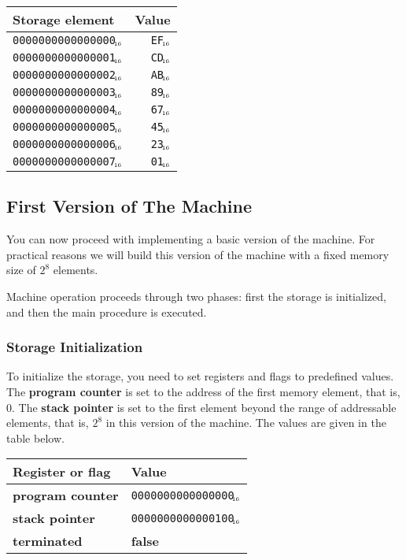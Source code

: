 \documentclass[a4paper,11pt]{article}
\newcommand{\PC}{\textbf{program counter}\xspace}
\newcommand{\SP}{\textbf{stack pointer}\xspace}
\newcommand{\TERM}{\textbf{terminated}\xspace}
\newcommand{\F}{\textbf{false}\xspace}
\newcommand{\num}[1]{\texttt{#1}\xspace}
\newcommand{\hex}[1]{\num{#1}$_{\textup{\tiny\hskip-1ex 16}}$\xspace}
\begin{document}
\begin{center}
  \begin{tabular}{@{}lr@{}}
    \hline
    Storage element        & Value    \\
    \hline
    \hex{0000000000000000} & \hex{EF} \\
    \hex{0000000000000001} & \hex{CD} \\
    \hex{0000000000000002} & \hex{AB} \\
    \hex{0000000000000003} & \hex{89} \\
    \hex{0000000000000004} & \hex{67} \\
    \hex{0000000000000005} & \hex{45} \\
    \hex{0000000000000006} & \hex{23} \\
    \hex{0000000000000007} & \hex{01} \\
    \hline
  \end{tabular}
\end{center}


\subsection{First Version of The Machine}

You can now proceed with implementing a basic version of the machine.
For practical reasons we will build this version of the machine with a fixed memory size of $2^{8}$ elements.

Machine operation proceeds through two phases: first the storage is initialized, and then the main procedure is executed.

\subsubsection{Storage Initialization}

To initialize the storage, you need to set registers and flags to predefined values.
The \PC is set to the address of the first memory element, that is, $0$.
The \SP is set to the first element beyond the range of addressable elements, that is, $2^{8}$ in this version of the machine.
The values are given in the table below.

\begin{center}
  \begin{tabular}{@{}ll@{}}
    \hline
    Register or flag & Value                   \\
    \hline
    \PC              & \hex{0000000000000000}  \\
    \SP              & \hex{0000000000000100}  \\
    \TERM            & \F                      \\
    \hline
  \end{tabular}
\end{center}
\end{document}
